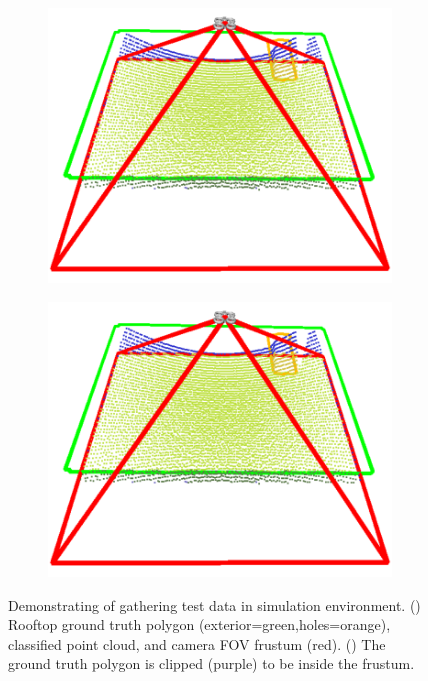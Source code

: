 \begin{figure}[ht]
 \centering
  \begin{subfigure}{.40\linewidth}
    \centering\includegraphics[page=1, width=.99\linewidth]{chapter_6_landingsim/figs/GroundTruthClipping.pdf}
    \caption{\label{fig:ch6_clipping_a}}
  \end{subfigure}
  \begin{subfigure}{.40\linewidth}
    \centering\includegraphics[page=2, width=.99\linewidth]{chapter_6_landingsim/figs/GroundTruthClipping.pdf}
    \caption{\label{fig:ch6_clipping_b}}
  \end{subfigure}
  \caption[Demonstrating of gathering test data in simulation environment.]{Demonstrating of gathering test data in simulation environment. () Rooftop ground truth polygon (exterior=green,holes=orange), classified point cloud, and camera FOV frustum (red). () The ground truth polygon is clipped (purple) to be inside the frustum.}\label{fig:ch6_clipping}
\end{figure}



